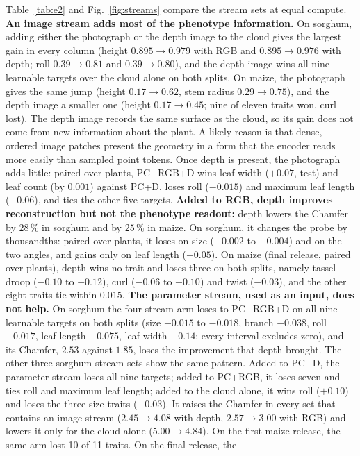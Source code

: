 Table~\ref{tab:e2} and Fig.~\ref{fig:streams} compare the stream sets at equal
compute. \textbf{An image stream adds most of the phenotype information.} On
sorghum, adding either the photograph or the depth image to the cloud gives the
largest gain in every column (height $0.895\!\to\!0.979$ with RGB and
$0.895\!\to\!0.976$ with depth; roll $0.39\!\to\!0.81$ and
$0.39\!\to\!0.80$), and the depth image wins all nine learnable targets over
the cloud alone on both splits. On maize, the photograph gives the same jump
(height $0.17\!\to\!0.62$, stem radius $0.29\!\to\!0.75$), and the depth
image a smaller one (height $0.17\!\to\!0.45$; nine of eleven traits won, curl
lost). The depth image
records the same surface as the cloud, so its gain does not come from new
information about the plant. A likely reason is that dense, ordered image
patches present the geometry in a form that the encoder reads more easily than
sampled point tokens. Once depth is present, the photograph adds little:
paired over plants, PC+RGB+D wins leaf width ($+0.07$, test) and leaf count
(by $0.001$) against PC+D, loses roll ($-0.015$) and maximum leaf length
($-0.06$), and ties the other five targets.
\textbf{Added to RGB, depth improves reconstruction but not the phenotype
readout:} depth
lowers the Chamfer by $28\,\%$ in sorghum and by $25\,\%$ in maize. On sorghum,
it changes the probe by thousandths: paired over plants, it loses on size
($-0.002$ to $-0.004$) and on the two angles, and gains only on leaf length
($+0.05$). On maize (final release, paired over plants), depth wins no trait and
loses three on both splits, namely tassel droop ($-0.10$ to $-0.12$), curl
($-0.06$ to $-0.10$) and twist ($-0.03$), and the other eight traits tie within
$0.015$.
\textbf{The parameter stream, used as an input, does not help.} On sorghum the
four-stream arm loses to PC+RGB+D on all nine learnable targets on both splits
(size $-0.015$ to $-0.018$, branch $-0.038$, roll $-0.017$, leaf length
$-0.075$, leaf width $-0.14$; every interval excludes zero), and its Chamfer,
$2.53$ against $1.85$, loses the improvement that depth brought. The other
three sorghum stream sets show the same pattern. Added to PC+D, the parameter
stream loses all nine targets; added to PC+RGB, it loses seven and ties roll and
maximum leaf length; added to the cloud alone, it wins roll ($+0.10$) and loses
the three size traits ($-0.03$). It raises the Chamfer in every set that
contains an image stream ($2.45\to4.08$ with depth, $2.57\to3.00$ with RGB)
and lowers it only for the cloud alone ($5.00\to4.84$). On the first
maize release, the same arm lost 10 of 11 traits. On the final release, the
